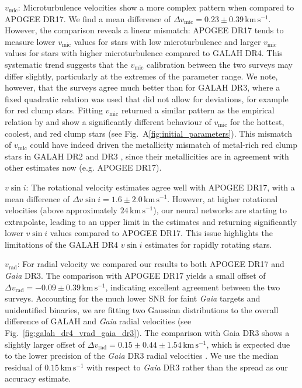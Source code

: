 \documentclass[
  journal=pasa,
  manuscript=research-paper, %
  year=2024,
  volume=37
]{cup-journal}
\newcommand{\vmic}{$v_\mathrm{mic}$\xspace}
\newcommand{\vsini}{$v \sin i$\xspace}
\newcommand{\vrad}{$v_\mathrm{rad}$\xspace}
\newcommand{\Gaia}{\textit{Gaia}\xspace}
\begin{document}
\vmic: Microturbulence velocities show a more complex pattern when compared to APOGEE DR17. We find a mean difference of $\Delta v_\mathrm{mic} = 0.23 \pm 0.39\,\mathrm{km\,s^{-1}}$. However, the comparison reveals a linear mismatch: APOGEE DR17 tends to measure lower \vmic values for stars with low microturbulence and larger \vmic values for stars with higher microturbulence compared to GALAH DR4. This systematic trend suggests that the \vmic calibration between the two surveys may differ slightly, particularly at the extremes of the parameter range. We note, however, that the surveys agree much better than for GALAH DR3, where a fixed quadratic relation was used that did not allow for deviations, for example for red clump stars. Fitting \vmic returned a similar pattern as the empirical relation by \citet{DutraFerreira2016} and show a significantly different behaviour of \vmic for the hottest, coolest, and red clump stars (see Fig.~A\ref{fig:initial_parameters}). This mismatch of \vmic could have indeed driven the metallicity mismatch of metal-rich red clump stars in GALAH DR2 and DR3 \citep{Buder2018, Buder2021}, since their metallicities are in agreement with other estimates now (e.g. APOGEE DR17).

\vsini: The rotational velocity estimates agree well with APOGEE DR17, with a mean difference of $\Delta v \sin i = 1.6 \pm 2.0\,\mathrm{km\,s^{-1}}$. However, at higher rotational velocities (above approximately $24\,\mathrm{km\,s^{-1}}$), our neural networks are starting to extrapolate, leading to an upper limit in the estimates and returning significantly lower \vsini values compared to APOGEE DR17. This issue highlights the limitations of the GALAH DR4 \vsini estimates for rapidly rotating stars.

\vrad: For radial velocity we compared our results to both APOGEE DR17 and \Gaia DR3. The comparison with APOGEE DR17 yields a small offset of $\Delta v_\mathrm{rad} = -0.09 \pm 0.39\,\mathrm{km\,s^{-1}}$, indicating excellent agreement between the two surveys. Accounting for the much lower SNR for faint \Gaia targets and unidentified binaries, we are fitting two Gaussian distributions to the overall difference of GALAH and \Gaia radial velocities (see Fig.~\ref{fig:galah_dr4_vrad_gaia_dr3}). The comparison with Gaia DR3 shows a slightly larger offset of $\Delta v_\mathrm{rad} = 0.15 \pm 0.44 \pm 1.54\,\mathrm{km\,s^{-1}}$, which is expected due to the lower precision of the \Gaia DR3 radial velocities \citep{Katz2023}. We use the median residual of $0.15\,\mathrm{km\,s^{-1}}$ with respect to \Gaia DR3 rather than the spread as our accuracy estimate.
\end{document}
